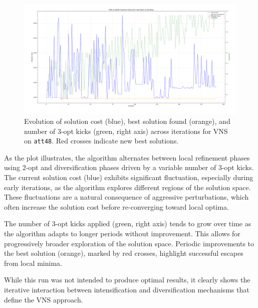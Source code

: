 \begin{figure}[H]
    \centering
    \includegraphics[width=\textwidth]{images/vns_run_att48.png}
    \caption{Evolution of solution cost (blue), best solution found (orange), and number of 3-opt kicks (green, right axis) across iterations for VNS on \texttt{att48}. Red crosses indicate new best solutions.}
    \label{fig:vns_plot}
\end{figure}

As the plot illustrates, the algorithm alternates between local refinement phases using 2-opt and diversification phases driven by a variable number of 3-opt kicks. The current solution cost (blue) exhibits significant fluctuation, especially during early iterations, as the algorithm explores different regions of the solution space. These fluctuations are a natural consequence of aggressive perturbations, which often increase the solution cost before re-converging toward local optima.

The number of 3-opt kicks applied (green, right axis) tends to grow over time as the algorithm adapts to longer periods without improvement. 
This allows for progressively broader exploration of the solution space. Periodic improvements to the best solution (orange), marked by red crosses, 
highlight successful escapes from local minima.

While this run was not intended to produce optimal results, it clearly shows the iterative interaction between intensification and diversification mechanisms that define the VNS approach.
